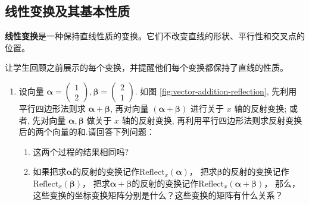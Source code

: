 \documentclass[lang=cn,newtx,10pt,scheme=chinese]{elegantbook}
\begin{document}
\subsection{线性变换及其基本性质}

\begin{definition}[线性变换]
  \textcolor{third}{\bf 线性变换}是一种保持直线性质的变换。它们不改变直线的形状、平行性和交叉点的位置。
\end{definition}

\begin{note}
  让学生回顾之前展示的每个变换，并提醒他们每个变换都保持了直线的性质。
\end{note}

\vspace*{0.5cm}

\begin{exercise}

  \begin{enumerate}
    \item   设向量 $\boldsymbol{\alpha}=\left(\begin{array}{l}1 \\ 2\end{array}\right), \boldsymbol{\beta}=\left(\begin{array}{l}2 \\ 1\end{array}\right)$. 
            如图 \ref{fig:vector-addition-reflection}, 先利用平行四边形法则求 $\boldsymbol{\alpha}+\boldsymbol{\beta}$, 再对向量 $(\boldsymbol{\alpha}+\boldsymbol{\beta})$ 进行关于 $x$ 轴的反射变换; 
            或者, 先对向量 $\boldsymbol{\alpha}, \boldsymbol{\beta}$ 做关于 $x$ 轴的反射变换, 
            再利用平行四边形法则求反射变换后的两个向量的和.请回答下列问题：

            \begin{enumerate}
              \item 这两个过程的结果相同吗?
              \item 如果把求$\boldsymbol{\alpha}$的反射的变换记作$\text{Reflect}_{x}(\boldsymbol{\alpha})$，
              把求$\boldsymbol{\beta}$的反射的变换记作$\text{Reflect}_{x}(\boldsymbol{\beta})$，
              把求$\boldsymbol{\alpha}+\boldsymbol{\beta}$的反射的变换记作$\text{Reflect}_{x}(\boldsymbol{\alpha}+\boldsymbol{\beta})$，
              那么，这些变换的坐标变换矩阵分别是什么？这些变换的矩阵有什么关系？
            \end{enumerate}

            \begin{figure}[!h]
            \centering
            \begin{tikzpicture}[scale=1, transform shape]


\end{tikzpicture}
\end{figure}
\end{enumerate}
\end{exercise}
\end{document}
